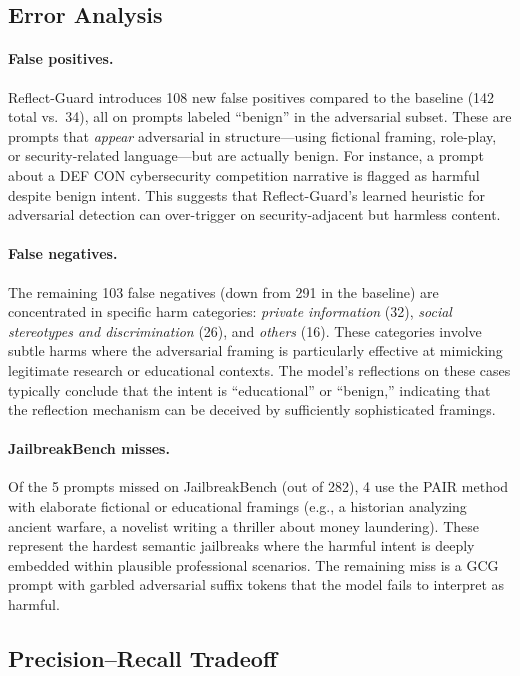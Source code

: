 \documentclass[Superintelligence,article,submit,pdftex,moreauthors]{Definitions/mdpi}
\begin{document}
\subsection{Error Analysis}

\paragraph{False positives.}
Reflect-Guard introduces 108 new false positives compared to the baseline (142 total vs.\ 34), all on prompts labeled ``benign'' in the adversarial subset. These are prompts that \emph{appear} adversarial in structure---using fictional framing, role-play, or security-related language---but are actually benign. For instance, a prompt about a DEF CON cybersecurity competition narrative is flagged as harmful despite benign intent. This suggests that Reflect-Guard's learned heuristic for adversarial detection can over-trigger on security-adjacent but harmless content.

\paragraph{False negatives.}
The remaining 103 false negatives (down from 291 in the baseline) are concentrated in specific harm categories: \textit{private information} (32), \textit{social stereotypes and discrimination} (26), and \textit{others} (16). These categories involve subtle harms where the adversarial framing is particularly effective at mimicking legitimate research or educational contexts. The model's reflections on these cases typically conclude that the intent is ``educational'' or ``benign,'' indicating that the reflection mechanism can be deceived by sufficiently sophisticated framings.

\paragraph{JailbreakBench misses.}
Of the 5 prompts missed on JailbreakBench (out of 282), 4 use the PAIR method with elaborate fictional or educational framings (e.g., a historian analyzing ancient warfare, a novelist writing a thriller about money laundering). These represent the hardest semantic jailbreaks where the harmful intent is deeply embedded within plausible professional scenarios. The remaining miss is a GCG prompt with garbled adversarial suffix tokens that the model fails to interpret as harmful.

\subsection{Precision--Recall Tradeoff}
\end{document}
